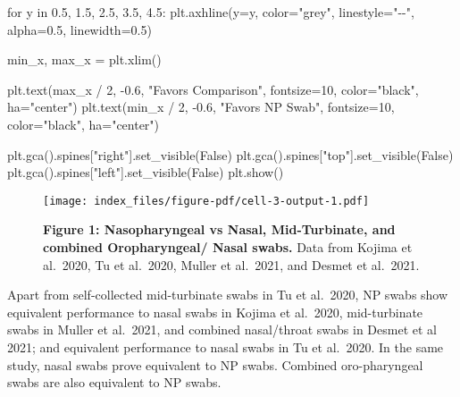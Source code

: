\documentclass[
  letterpaper,
  DIV=11,
  numbers=noendperiod]{scrartcl}
\newenvironment{Shaded}{\begin{snugshade}}{\end{snugshade}}
\newcommand{\ControlFlowTok}[1]{\textcolor[rgb]{0.00,0.23,0.31}{#1}}
\newcommand{\DecValTok}[1]{\textcolor[rgb]{0.68,0.00,0.00}{#1}}
\newcommand{\FloatTok}[1]{\textcolor[rgb]{0.68,0.00,0.00}{#1}}
\newcommand{\KeywordTok}[1]{\textcolor[rgb]{0.00,0.23,0.31}{#1}}
\newcommand{\NormalTok}[1]{\textcolor[rgb]{0.00,0.23,0.31}{#1}}
\newcommand{\OperatorTok}[1]{\textcolor[rgb]{0.37,0.37,0.37}{#1}}
\newcommand{\StringTok}[1]{\textcolor[rgb]{0.13,0.47,0.30}{#1}}
\newcommand{\VariableTok}[1]{\textcolor[rgb]{0.07,0.07,0.07}{#1}}
\begin{document}
\begin{Shaded}
\begin{Highlighting}[]
\ControlFlowTok{for}\NormalTok{ y }\KeywordTok{in} \FloatTok{0.5}\NormalTok{, }\FloatTok{1.5}\NormalTok{, }\FloatTok{2.5}\NormalTok{, }\FloatTok{3.5}\NormalTok{, }\FloatTok{4.5}\NormalTok{:}
\NormalTok{    plt.axhline(y}\OperatorTok{=}\NormalTok{y, color}\OperatorTok{=}\StringTok{"grey"}\NormalTok{, linestyle}\OperatorTok{=}\StringTok{"{-}{-}"}\NormalTok{, alpha}\OperatorTok{=}\FloatTok{0.5}\NormalTok{, linewidth}\OperatorTok{=}\FloatTok{0.5}\NormalTok{)}

\NormalTok{min\_x, max\_x }\OperatorTok{=}\NormalTok{ plt.xlim()}

\NormalTok{plt.text(max\_x }\OperatorTok{/} \DecValTok{2}\NormalTok{, }\OperatorTok{{-}}\FloatTok{0.6}\NormalTok{, }\StringTok{"Favors Comparison"}\NormalTok{, fontsize}\OperatorTok{=}\DecValTok{10}\NormalTok{, color}\OperatorTok{=}\StringTok{"black"}\NormalTok{, ha}\OperatorTok{=}\StringTok{"center"}\NormalTok{)}
\NormalTok{plt.text(min\_x }\OperatorTok{/} \DecValTok{2}\NormalTok{, }\OperatorTok{{-}}\FloatTok{0.6}\NormalTok{, }\StringTok{"Favors NP Swab"}\NormalTok{, fontsize}\OperatorTok{=}\DecValTok{10}\NormalTok{, color}\OperatorTok{=}\StringTok{"black"}\NormalTok{, ha}\OperatorTok{=}\StringTok{"center"}\NormalTok{)}

\NormalTok{plt.gca().spines[}\StringTok{"right"}\NormalTok{].set\_visible(}\VariableTok{False}\NormalTok{)}
\NormalTok{plt.gca().spines[}\StringTok{"top"}\NormalTok{].set\_visible(}\VariableTok{False}\NormalTok{)}
\NormalTok{plt.gca().spines[}\StringTok{"left"}\NormalTok{].set\_visible(}\VariableTok{False}\NormalTok{)}
\NormalTok{plt.show()}
\end{Highlighting}
\end{Shaded}

\begin{figure}[H]

{\centering \texttt{[image: index\_files/figure-pdf/cell-3-output-1.pdf]}

}

\caption{\textbf{Figure 1: Nasopharyngeal vs Nasal, Mid-Turbinate, and
combined Oropharyngeal/ Nasal swabs.} Data from Kojima et al.~2020, Tu
et al.~2020, Muller et al.~2021, and Desmet et al.~2021.}

\end{figure}%

Apart from self-collected mid-turbinate swabs in Tu et al.~2020, NP
swabs show equivalent performance to nasal swabs in Kojima et al.~2020,
mid-turbinate swabs in Muller et al.~2021, and combined nasal/throat
swabs in Desmet et al 2021; and equivalent performance to nasal swabs in
Tu et al.~2020. In the same study, nasal swabs prove equivalent to NP
swabs. Combined oro-pharyngeal swabs are also equivalent to NP swabs.
\end{document}
